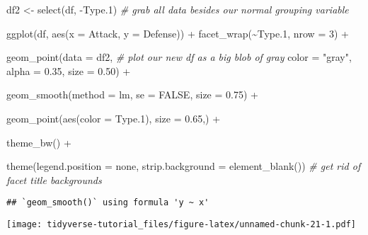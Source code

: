 \documentclass[
]{article}
\newenvironment{Shaded}{\begin{snugshade}}{\end{snugshade}}
\newcommand{\AttributeTok}[1]{\textcolor[rgb]{0.77,0.63,0.00}{#1}}
\newcommand{\CommentTok}[1]{\textcolor[rgb]{0.56,0.35,0.01}{\textit{#1}}}
\newcommand{\ConstantTok}[1]{\textcolor[rgb]{0.00,0.00,0.00}{#1}}
\newcommand{\DecValTok}[1]{\textcolor[rgb]{0.00,0.00,0.81}{#1}}
\newcommand{\FloatTok}[1]{\textcolor[rgb]{0.00,0.00,0.81}{#1}}
\newcommand{\FunctionTok}[1]{\textcolor[rgb]{0.00,0.00,0.00}{#1}}
\newcommand{\NormalTok}[1]{#1}
\newcommand{\OtherTok}[1]{\textcolor[rgb]{0.56,0.35,0.01}{#1}}
\newcommand{\SpecialCharTok}[1]{\textcolor[rgb]{0.00,0.00,0.00}{#1}}
\newcommand{\StringTok}[1]{\textcolor[rgb]{0.31,0.60,0.02}{#1}}
\begin{document}
\begin{Shaded}
\begin{Highlighting}[]
\NormalTok{df2 }\OtherTok{\textless{}{-}} \FunctionTok{select}\NormalTok{(df, }\SpecialCharTok{{-}}\NormalTok{Type}\FloatTok{.1}\NormalTok{)                }\CommentTok{\# grab all data besides our normal grouping variable}

\FunctionTok{ggplot}\NormalTok{(df, }\FunctionTok{aes}\NormalTok{(}\AttributeTok{x =}\NormalTok{ Attack, }\AttributeTok{y =}\NormalTok{ Defense)) }\SpecialCharTok{+}
  \FunctionTok{facet\_wrap}\NormalTok{(}\SpecialCharTok{\textasciitilde{}}\NormalTok{Type}\FloatTok{.1}\NormalTok{,                   }
             \AttributeTok{nrow =} \DecValTok{3}\NormalTok{) }\SpecialCharTok{+}
  
  \FunctionTok{geom\_point}\NormalTok{(}\AttributeTok{data =}\NormalTok{ df2,                  }\CommentTok{\# plot our new df as a big blob of gray}
             \AttributeTok{color =} \StringTok{"gray"}\NormalTok{,}
             \AttributeTok{alpha =} \FloatTok{0.35}\NormalTok{,}
             \AttributeTok{size =} \FloatTok{0.50}\NormalTok{) }\SpecialCharTok{+}
  
  \FunctionTok{geom\_smooth}\NormalTok{(}\AttributeTok{method =} \StringTok{\textquotesingle{}lm\textquotesingle{}}\NormalTok{,             }
              \AttributeTok{se =} \ConstantTok{FALSE}\NormalTok{,               }
              \AttributeTok{size =} \FloatTok{0.75}\NormalTok{) }\SpecialCharTok{+}
  
  \FunctionTok{geom\_point}\NormalTok{(}\FunctionTok{aes}\NormalTok{(}\AttributeTok{color =}\NormalTok{ Type}\FloatTok{.1}\NormalTok{),  }
             \AttributeTok{size =} \FloatTok{0.65}\NormalTok{,) }\SpecialCharTok{+}
  
  \FunctionTok{theme\_bw}\NormalTok{() }\SpecialCharTok{+} 
  
  \FunctionTok{theme}\NormalTok{(}\AttributeTok{legend.position =} \StringTok{\textquotesingle{}none\textquotesingle{}}\NormalTok{,           }
        \AttributeTok{strip.background =} \FunctionTok{element\_blank}\NormalTok{()) }\CommentTok{\# get rid of facet title backgrounds}
\end{Highlighting}
\end{Shaded}

\begin{verbatim}
## `geom_smooth()` using formula 'y ~ x'
\end{verbatim}

\texttt{[image: tidyverse-tutorial\_files/figure-latex/unnamed-chunk-21-1.pdf]}
\end{document}
